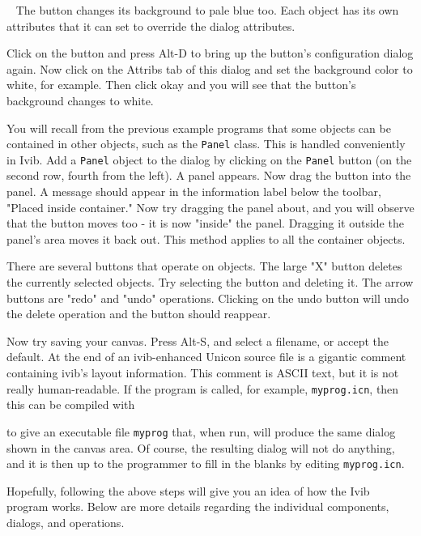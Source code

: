 \bigskip

\medskip{}\ {\sffamily
The button changes its background to pale blue too. Each
object has its own attributes that it can set to override the dialog
attributes.}\medskip

Click on the button and press Alt-D to bring up the
button's configuration dialog again. Now click on the
Attribs tab of this dialog and set the background color to white, for
example. Then click okay and you will see that the
button's background changes to white.

You will recall from the previous example programs that some objects can
be contained in other objects, such as the \texttt{Panel} class. This
is handled conveniently in Ivib. Add a \texttt{Panel} object to the
dialog by clicking on the \texttt{Panel} button (on the second row,
fourth from the left). A panel appears. Now drag the button into the
panel. A message should appear in the information label below the
toolbar, "Placed inside container." Now try
dragging the panel about, and you will observe that the button moves
too - it is now "inside" the panel.
Dragging it outside the panel's area moves it back
out. This method applies to all the container objects.

There are several buttons that operate on objects. The large
"X" button deletes the currently selected
objects. Try selecting the button and deleting it. The arrow buttons
are "redo" and
"undo" operations. Clicking on the undo
button will undo the delete operation and the button should reappear.

Now try saving your canvas. Press Alt-S, and select a filename, or
accept the default. At the end of an ivib-enhanced Unicon source file
is a gigantic comment containing ivib's layout
information. This comment is ASCII text, but it is not
really human-readable. If the program is called, for example,
\texttt{myprog.icn}, then this can be compiled with


\noindent
to give an executable file \texttt{myprog} that, when run, will produce
the same dialog shown in the canvas area. Of course, the resulting
dialog will not do anything, and it is then up to the programmer to
fill in the blanks by editing \texttt{myprog.icn}.

Hopefully, following the above steps will give you an idea of how the
Ivib program works. Below are more details regarding the individual
components, dialogs, and operations.

